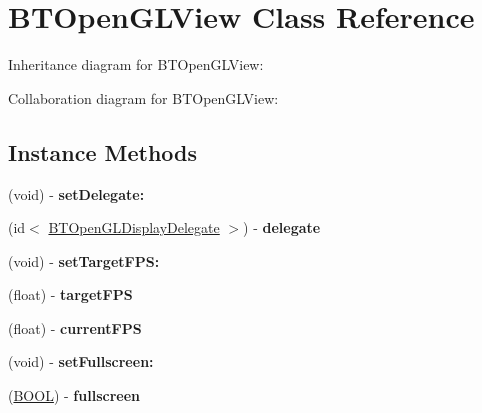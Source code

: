 \hypertarget{interface_b_t_open_g_l_view}{\section{B\+T\+Open\+G\+L\+View Class Reference}
\label{interface_b_t_open_g_l_view}
}


Inheritance diagram for B\+T\+Open\+G\+L\+View\+:


Collaboration diagram for B\+T\+Open\+G\+L\+View\+:
\subsection*{Instance Methods}
\begin{DoxyCompactItemize}
\item 
\hypertarget{interface_b_t_open_g_l_view_ac09a212352950f58732330d1c7ffbff3}{(void) -\/ {\bfseries set\+Delegate\+:}}\label{interface_b_t_open_g_l_view_ac09a212352950f58732330d1c7ffbff3}

\item 
\hypertarget{interface_b_t_open_g_l_view_a111e3e6366e0a35b29ed3f715ac394f5}{(id$<$ \hyperlink{protocol_b_t_open_g_l_display_delegate-p}{B\+T\+Open\+G\+L\+Display\+Delegate} $>$) -\/ {\bfseries delegate}}\label{interface_b_t_open_g_l_view_a111e3e6366e0a35b29ed3f715ac394f5}

\item 
\hypertarget{interface_b_t_open_g_l_view_a5d0ec50374666edcd411d5ab0d0e409f}{(void) -\/ {\bfseries set\+Target\+F\+P\+S\+:}}\label{interface_b_t_open_g_l_view_a5d0ec50374666edcd411d5ab0d0e409f}

\item 
\hypertarget{interface_b_t_open_g_l_view_a252d670c9e35091a02e9b2386c984314}{(float) -\/ {\bfseries target\+F\+P\+S}}\label{interface_b_t_open_g_l_view_a252d670c9e35091a02e9b2386c984314}

\item 
\hypertarget{interface_b_t_open_g_l_view_ae9df842653ff9d184e2ff90b983b231d}{(float) -\/ {\bfseries current\+F\+P\+S}}\label{interface_b_t_open_g_l_view_ae9df842653ff9d184e2ff90b983b231d}

\item 
\hypertarget{interface_b_t_open_g_l_view_aa79b98ed3c0f9d6c0c644f0de98c5486}{(void) -\/ {\bfseries set\+Fullscreen\+:}}\label{interface_b_t_open_g_l_view_aa79b98ed3c0f9d6c0c644f0de98c5486}

\item 
\hypertarget{interface_b_t_open_g_l_view_a59b849b60cb1c11c710f84f15ad54539}{(\hyperlink{_ice_types_8h_a050c65e107f0c828f856a231f4b4e788}{B\+O\+O\+L}) -\/ {\bfseries fullscreen}}\label{interface_b_t_open_g_l_view_a59b849b60cb1c11c710f84f15ad54539}


\end{DoxyCompactItemize}
